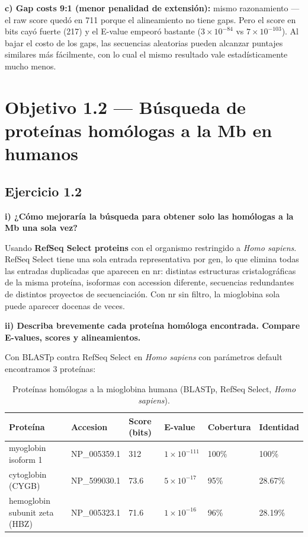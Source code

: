 \textbf{c) Gap costs 9:1 (menor penalidad de extensión):} mismo razonamiento --- el raw score quedó en 711
porque el alineamiento no tiene gaps. Pero el score en bits cayó fuerte (217) y el E-value empeoró bastante
($3 \times 10^{-84}$ vs $7 \times 10^{-103}$). Al bajar el costo de los gaps, las secuencias aleatorias
pueden alcanzar puntajes similares más fácilmente, con lo cual el mismo resultado vale estadísticamente
mucho menos.

\section{Objetivo 1.2 — Búsqueda de proteínas homólogas a la Mb en humanos}

\subsection{Ejercicio 1.2}

\textbf{i) ¿Cómo mejoraría la búsqueda para obtener solo las homólogas a la Mb una sola vez?}

Usando \textbf{RefSeq Select proteins} con el organismo restringido a \textit{Homo sapiens}. RefSeq Select
tiene una sola entrada representativa por gen, lo que elimina todas las entradas duplicadas que aparecen en
nr: distintas estructuras cristalográficas de la misma proteína, isoformas con accession diferente,
secuencias redundantes de distintos proyectos de secuenciación. Con nr sin filtro, la mioglobina sola puede
aparecer docenas de veces.

\textbf{ii) Describa brevemente cada proteína homóloga encontrada. Compare E-values, scores y
alineamientos.}

Con BLASTp contra RefSeq Select en \textit{Homo sapiens} con parámetros default encontramos 3 proteínas:

\begin{table}[H]
\centering
\footnotesize
\begin{tabular}{llP{2cm}P{2cm}P{1.5cm}P{1.5cm}}
\toprule
Proteína & Accesion & Score (bits) & E-value & Cobertura & Identidad \\
\midrule
myoglobin isoform 1          & NP\_005359.1 & 312  & $1 \times 10^{-111}$  & 100\% & 100\%   \\
cytoglobin (CYGB)            & NP\_599030.1 & 73.6 & $5 \times 10^{-17}$   & 95\%  & 28.67\% \\
hemoglobin subunit zeta (HBZ) & NP\_005323.1 & 71.6 & $1 \times 10^{-16}$   & 96\%  & 28.19\% \\
\bottomrule
\end{tabular}
\caption{Proteínas homólogas a la mioglobina humana (BLASTp, RefSeq Select, \textit{Homo sapiens}).}
\end{table}

